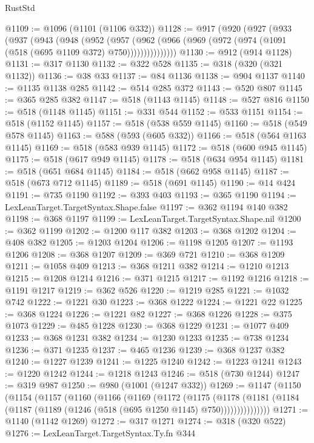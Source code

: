 \begin{lexlean}{RustStd}
\begin{coremodule}
@1109 := @1096 (@1101 (@1106 @332))
@1128 := @917
    (@920
      (@927
        (@933
          (@937
            (@943
              (@948
                (@952
                  (@957
                    (@962 (@966 (@969 (@972 (@974 (@1091 (@518 (@695 @1109 @372) @750)))))))))))))))
@1130 := @912 (@914 @1128)
@1131 := @317 @1130
@1132 := @322 @528
@1135 := @318 (@320 (@321 @1132))
@1136 := @38 @33
@1137 := @84 @1136
@1138 := @904 @1137
@1140 := @1135 @1138 @285
@1142 := @514 @285 @372
@1143 := @520 @807
@1145 := @365 @285 @382
@1147 := @518 (@1143 @1145)
@1148 := @527 @816
@1150 := @518 (@1148 @1145)
@1151 := @331 @544
@1152 := @533 @1151
@1154 := @518 (@1152 @1145)
@1157 := @518 (@538 @559 @1145)
@1160 := @518 (@549 @578 @1145)
@1163 := @588 (@593 (@605 @332))
@1166 := @518 (@564 @1163 @1145)
@1169 := @518 (@583 @939 @1145)
@1172 := @518 (@600 @945 @1145)
@1175 := @518 (@617 @949 @1145)
@1178 := @518 (@634 @954 @1145)
@1181 := @518 (@651 @684 @1145)
@1184 := @518 (@662 @958 @1145)
@1187 := @518 (@673 @712 @1145)
@1189 := @518 (@691 @1145)
@1190 := @14 @424
@1191 := @735 @1190
@1192 := @393 @403
@1193 := @365 @1190
@1194 := LexLeanTarget.TargetSyntax.Shape.false
@1197 := @362 @1194 @140 @382
@1198 := @368 @1197
@1199 := LexLeanTarget.TargetSyntax.Shape.nil
@1200 := @362 @1199
@1202 := @1200 @117 @382
@1203 := @368 @1202
@1204 := @408 @382
@1205 := @1203 @1204
@1206 := @1198 @1205
@1207 := @1193 @1206
@1208 := @368 @1207
@1209 := @369 @721
@1210 := @368 @1209
@1211 := @1058 @409
@1213 := @368 @1211 @382
@1214 := @1210 @1213
@1215 := @1208 @1214
@1216 := @371 @1215
@1217 := @1192 @1216
@1218 := @1191 @1217
@1219 := @362 @526
@1220 := @1219 @285
@1221 := @1032 @742
@1222 := @1221 @30
@1223 := @368 @1222
@1224 := @1221 @22
@1225 := @368 @1224
@1226 := @1221 @82
@1227 := @368 @1226
@1228 := @375 @1073
@1229 := @485 @1228
@1230 := @368 @1229
@1231 := @1077 @409
@1233 := @368 @1231 @382
@1234 := @1230 @1233
@1235 := @738 @1234
@1236 := @371 @1235
@1237 := @465 @1236
@1239 := @368 @1237 @382
@1240 := @1227 @1239
@1241 := @1225 @1240
@1242 := @1223 @1241
@1243 := @1220 @1242
@1244 := @1218 @1243
@1246 := @518 (@730 @1244)
@1247 := @319 @987
@1250 := @980 (@1001 (@1247 @332))
@1269 := @1147
    (@1150
      (@1154
        (@1157
          (@1160
            (@1166
              (@1169
                (@1172
                  (@1175
                    (@1178
                      (@1181
                        (@1184 (@1187 (@1189 (@1246 (@518 (@695 @1250 @1145) @750)))))))))))))))
@1271 := @1140 (@1142 @1269)
@1272 := @317 @1271
@1274 := @318 (@320 @522)
@1276 := LexLeanTarget.TargetSyntax.Ty.fn @344

\end{coremodule}
\end{lexlean}
